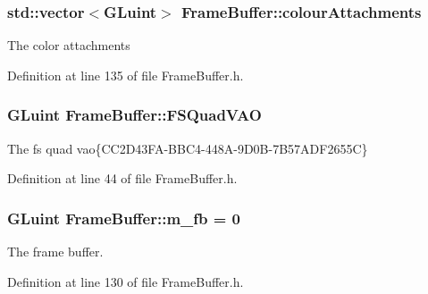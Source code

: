 \subsubsection[{\texorpdfstring{colour\+Attachments}{colourAttachments}}]{\setlength{\rightskip}{0pt plus 5cm}std\+::vector$<$G\+Luint$>$ Frame\+Buffer\+::colour\+Attachments\hspace{0.3cm}{\ttfamily [private]}}\hypertarget{class_frame_buffer_af350664cd46e6ff4697e6d3b26478be6}{}\label{class_frame_buffer_af350664cd46e6ff4697e6d3b26478be6}


The color attachments 



Definition at line 135 of file Frame\+Buffer.\+h.

\subsubsection[{\texorpdfstring{F\+S\+Quad\+V\+AO}{FSQuadVAO}}]{\setlength{\rightskip}{0pt plus 5cm}G\+Luint Frame\+Buffer\+::\+F\+S\+Quad\+V\+AO\hspace{0.3cm}{\ttfamily [static]}}\hypertarget{class_frame_buffer_a22b0c9de2bef06e0de865684556a6677}{}\label{class_frame_buffer_a22b0c9de2bef06e0de865684556a6677}


The fs quad vao\{C\+C2\+D43\+F\+A-\/\+B\+B\+C4-\/448\+A-\/9\+D0\+B-\/7\+B57\+A\+D\+F2655C\} 



Definition at line 44 of file Frame\+Buffer.\+h.

\subsubsection[{\texorpdfstring{m\+\_\+fb}{m_fb}}]{\setlength{\rightskip}{0pt plus 5cm}G\+Luint Frame\+Buffer\+::m\+\_\+fb = 0\hspace{0.3cm}{\ttfamily [private]}}\hypertarget{class_frame_buffer_a4140264eca6a28a671947acb116df1ca}{}\label{class_frame_buffer_a4140264eca6a28a671947acb116df1ca}


The frame buffer. 



Definition at line 130 of file Frame\+Buffer.\+h.

